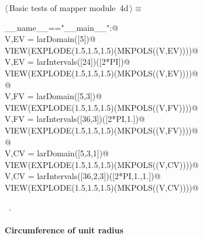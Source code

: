 \documentclass[11pt,oneside]{article}	%
\begin{document}
	
\begin{flushleft} \small \label{scrap13}
\protect{}$\langle\,$Basic tests of mapper module\nobreak\ {\footnotesize 4d}$\,\rangle\equiv$
\vspace{-1ex}
\begin{list}{}{} \item
\mbox{}\verb@if __name__=="__main__":@\\
\mbox{}\verb@   V,EV = larDomain([5])@\\
\mbox{}\verb@   VIEW(EXPLODE(1.5,1.5,1.5)(MKPOLS((V,EV))))@\\
\mbox{}\verb@   V,EV = larIntervals([24])([2*PI])@\\
\mbox{}\verb@   VIEW(EXPLODE(1.5,1.5,1.5)(MKPOLS((V,EV))))@\\
\mbox{}\verb@      @\\
\mbox{}\verb@   V,FV = larDomain([5,3])@\\
\mbox{}\verb@   VIEW(EXPLODE(1.5,1.5,1.5)(MKPOLS((V,FV))))@\\
\mbox{}\verb@   V,FV = larIntervals([36,3])([2*PI,1.])@\\
\mbox{}\verb@   VIEW(EXPLODE(1.5,1.5,1.5)(MKPOLS((V,FV))))@\\
\mbox{}\verb@      @\\
\mbox{}\verb@   V,CV = larDomain([5,3,1])@\\
\mbox{}\verb@   VIEW(EXPLODE(1.5,1.5,1.5)(MKPOLS((V,CV))))@\\
\mbox{}\verb@   V,CV = larIntervals([36,2,3])([2*PI,1.,1.])@\\
\mbox{}\verb@   VIEW(EXPLODE(1.5,1.5,1.5)(MKPOLS((V,CV))))@\\
\mbox{}\verb@@{\NWsep}
\end{list}
\vspace{-1ex}
\footnotesize\addtolength{\baselineskip}{-1ex}
\begin{list}{}{\setlength{\itemsep}{-\parsep}\setlength{\itemindent}{-\leftmargin}}
\item \NWtxtMacroRefIn\ .
\end{list}
\end{flushleft}

\paragraph{Circumference of unit radius}
\end{document}
